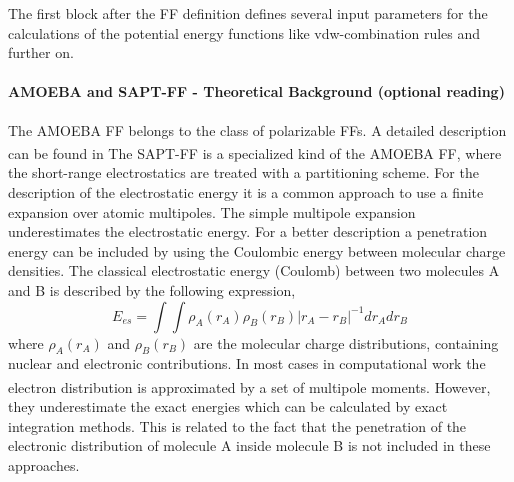 \documentclass[a4paper,11pt]{scrartcl}
\newcommand{\myCite}[1]{\textsuperscript{\cite{#1}}}
\begin{document}
The first block after the FF definition defines several input parameters for the calculations of the potential energy functions like vdw-combination rules and further on.
  

\paragraph{AMOEBA and SAPT-FF - Theoretical Background (optional reading)}
The AMOEBA FF belongs to the class of polarizable FFs. A detailed description can be found in \myCite{Ponder2010}  The SAPT-FF is a specialized kind of the AMOEBA FF, where the short-range electrostatics are treated with a partitioning scheme.
For the description of the electrostatic energy it is a common approach
to use a finite expansion over atomic multipoles. The simple multipole
expansion underestimates the electrostatic energy. For a better
description a penetration energy can be included by using the Coulombic
energy between molecular charge densities. The classical electrostatic
energy (Coulomb) between two molecules A and B is described by the
following expression,
\begin{equation}
E_{es}=\int\int\rho_{A}(r_{A})\rho_{B}(r_{B})|r_{A}-r_{B}|^{-1}dr_{A}dr_{B}\label{eq:Coulombic}
\end{equation}
where $\rho_{A}(r_{A})$ and $\rho_{B}(r_{B})$ are the molecular
charge distributions, containing nuclear and electronic contributions.
In most cases in computational work the electron distribution is approximated
by a set of multipole moments\myCite{Stone1996}. However,
they underestimate the exact energies which can be calculated by exact
integration methods. This is related to the fact that the penetration
of the electronic distribution of molecule A inside molecule B is
not included in these approaches. 
\end{document}
